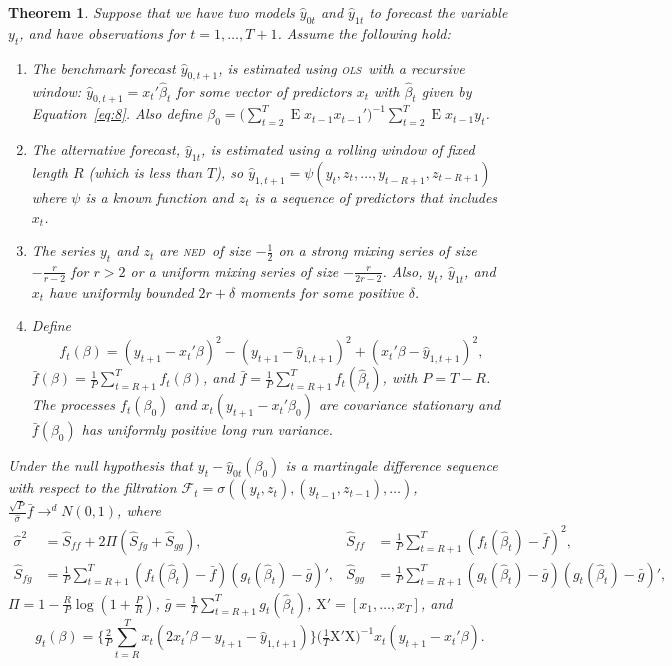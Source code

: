 \documentclass[12pt,fleqn]{article}
\newtheorem{thm}{Theorem}
\theoremstyle{definition}
\DeclareMathOperator{\E}{E}
\newcommand{\X}{\ensuremath{\mathrm{X}}}
\newcommand{\ned}{\textsc{ned}}
\newcommand{\ols}{\textsc{ols}}
\begin{document}
\begin{thm}\label{res:1}
  Suppose that we have two models $\hat{y}_{0t}$ and $\hat{y}_{1t}$ to
  forecast the variable $y_t$, and have observations for
  $t=1,\dots,T+1$.  Assume the following hold:
  \begin{enumerate}
  \item \label{item:1} The benchmark forecast $\hat{y}_{0,t+1}$, is
    estimated using \ols\ with a recursive window: $\hat{y}_{0,t+1} =
    x_t'\hat{\beta}_t$ for some vector of predictors $x_t$ with
    $\hat{\beta}_t$ given by Equation~\eqref{eq:8}.  Also define
    $\beta_0 = \big(\sum_{t=2}^{T} \E x_{t-1} x_{t-1}'\big)^{-1}
    \sum_{t=2}^T \E x_{t-1} y_t$.
  \item \label{item:2} The alternative forecast, $\hat{y}_{1t}$, is
    estimated using a rolling window of fixed length $R$ (which is
    less than $T$), so $\hat{y}_{1,t+1} =
    \psi(y_t,z_t,\dots,y_{t-R+1}, z_{t-R+1})$ where $\psi$ is a known
    function and $z_t$ is a sequence of predictors that includes
    $x_t$.
  \item \label{item:3} The series $y_t$ and $z_t$ are \ned\ of size
    $-\frac12$ on a strong mixing series of size $-\frac{r}{r-2}$ for $r>2$ or a
    uniform mixing series of size $-\frac{r}{2r-2}$.  Also, $y_t$,
    $\hat{y}_{1t}$, and $x_t$ have uniformly bounded $2 r+\delta$
    moments for some positive $\delta$.
  \item \label{item:4} Define \[f_t(\beta) = (y_{t+1} - x_t'\beta)^2 -
    (y_{t+1} - \hat{y}_{1,t+1})^2 + (x_t'\beta - \hat{y}_{1,t+1})^2,\]
    $\bar{f}(\beta) = \tfrac1P \sum_{t=R+1}^T f_t(\beta)$, and $\bar f =
    \tfrac1P \sum_{t=R+1}^{T} f_t(\hat{\beta}_t)$, with $P = T - R$. The
    processes $f_t(\beta_0)$ and $x_t(y_{t+1} - x_t'\beta_0)$ are
    covariance stationary and $\bar f(\beta_0)$ has uniformly positive
    long run variance.
  \end{enumerate}
  Under the null hypothesis that $y_t - \hat{y}_{0t}(\beta_0)$ is a
  martingale difference sequence with respect to the filtration
  $\mathcal{F}_t = \sigma((y_t, z_{t}), (y_{t-1}, z_{t-1}),\dots)$,
  $\tfrac{\sqrt{P}}{\hat\sigma} \bar f \to^d N(0,1)$, where 
  \begin{align*}
    \hat{\sigma}^2 &= \hat{S}_{ff} + 2 \Pi (\hat{S}_{fg} + \hat{S}_{gg}), &
    \hat{S}_{ff} &= \tfrac1P \sum_{t=R+1}^T (f_t(\hat{\beta}_t) - \bar
    f)^2, \\
    \hat{S}_{fg} &= \tfrac1P \sum_{t=R+1}^T (f_t(\hat{\beta}_t) -
    \bar{f})(g_t(\hat{\beta}_t) - \bar g)', &
    \hat{S}_{gg} &= \tfrac1P \sum_{t=R+1}^T (g_t(\hat{\beta}_t) - \bar
    g)(g_t(\hat{\beta}_t) - \bar g)',
  \end{align*}
  $\Pi = 1 - \tfrac{R}{P} \log(1 + \tfrac{P}{R})$, $\bar{g} = \tfrac1T
  \sum_{t=R+1}^T g_t(\hat{\beta}_t)$, $\X' = [x_1,\dots,x_T]$, and
  \begin{equation*}
    g_t(\beta) = \Big\{\tfrac{2}{P}\sum_{t=R}^T x_t (2 x_t'\beta -
    y_{t+1} - \hat{y}_{1,t+1}) \Big\} \big(\tfrac1T \X'\X \big)^{-1}
    x_t(y_{t+1} - x_t'\beta).
  \end{equation*}
\end{thm}
\end{document}
